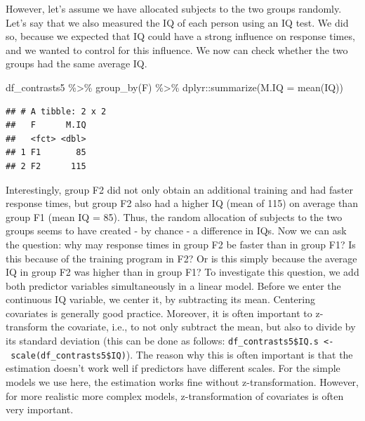 \documentclass[
  12pt,
]{krantz}
\newenvironment{Shaded}{\begin{snugshade}}{\end{snugshade}}
\newcommand{\AttributeTok}[1]{\textcolor[rgb]{0.77,0.63,0.00}{#1}}
\newcommand{\DecValTok}[1]{\textcolor[rgb]{0.00,0.00,0.81}{#1}}
\newcommand{\FunctionTok}[1]{\textcolor[rgb]{0.00,0.00,0.00}{#1}}
\newcommand{\NormalTok}[1]{#1}
\newcommand{\OtherTok}[1]{\textcolor[rgb]{0.56,0.35,0.01}{#1}}
\newcommand{\SpecialCharTok}[1]{\textcolor[rgb]{0.00,0.00,0.00}{#1}}
\theoremstyle{definition}
\theoremstyle{definition}
\theoremstyle{definition}
\theoremstyle{definition}
\theoremstyle{remark}
\begin{document}
However, let's assume we have allocated subjects to the two groups randomly. Let's say that we also measured the IQ of each person using an IQ test. We did so, because we expected that IQ could have a strong influence on response times, and we wanted to control for this influence. We now can check whether the two groups had the same average IQ.

\begin{Shaded}
\begin{Highlighting}[]
\NormalTok{df\_contrasts5 }\SpecialCharTok{\%\textgreater{}\%}
  \FunctionTok{group\_by}\NormalTok{(F) }\SpecialCharTok{\%\textgreater{}\%}
\NormalTok{  dplyr}\SpecialCharTok{::}\FunctionTok{summarize}\NormalTok{(}\AttributeTok{M.IQ =} \FunctionTok{mean}\NormalTok{(IQ))}
\end{Highlighting}
\end{Shaded}

\begin{verbatim}
## # A tibble: 2 x 2
##   F      M.IQ
##   <fct> <dbl>
## 1 F1       85
## 2 F2      115
\end{verbatim}

Interestingly, group F2 did not only obtain an additional training and had faster response times, but group F2 also had a higher IQ (mean of 115) on average than group F1 (mean IQ = 85). Thus, the random allocation of subjects to the two groups seems to have created - by chance - a difference in IQs. Now we can ask the question: why may response times in group F2 be faster than in group F1? Is this because of the training program in F2? Or is this simply because the average IQ in group F2 was higher than in group F1? To investigate this question, we add both predictor variables simultaneously in a linear model. Before we enter the continuous IQ variable, we center it, by subtracting its mean. Centering covariates is generally good practice. Moreover, it is often important to z-transform the covariate, i.e., to not only subtract the mean, but also to divide by its standard deviation (this can be done as follows: \texttt{df\_contrasts5\$IQ.s\ \textless{}-\ scale(df\_contrasts5\$IQ)}). The reason why this is often important is that the estimation doesn't work well if predictors have different scales. For the simple models we use here, the estimation works fine without z-transformation. However, for more realistic more complex models, z-transformation of covariates is often very important.

\begin{Shaded}
\end{Shaded}
\end{document}

